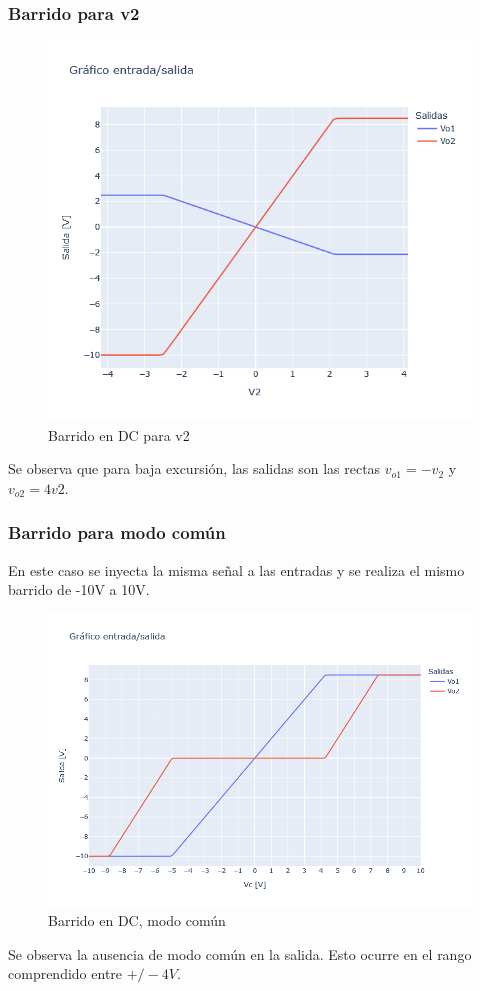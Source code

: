 \subsubsection{Barrido para v2}
\begin{figure}[H]
    \centering
    \includegraphics[width=0.7\linewidth]{Secciones/Circuito1/TP1_1_Vo1_Vo2_vs_V2.png}
    
    \caption{Barrido en DC para v2}
\end{figure}
Se observa que para baja excursión, las salidas son las rectas \(v_{o1}= -v_2\)  y \(v_{o2}= 4v2\).

\subsubsection{Barrido para modo común}

En este caso se inyecta la misma señal a las entradas y se realiza el mismo barrido de -10V a 10V.
\begin{figure}[H]
    \centering
    \includegraphics[width=1\linewidth]{Secciones/Circuito1/TP1_1_Vo1_Vo2_vs_Vc.png}
    
    \caption{Barrido en DC, modo común}
\end{figure}
Se observa la ausencia de modo común en la salida. Esto ocurre en el rango comprendido entre \(+/-4V\).

